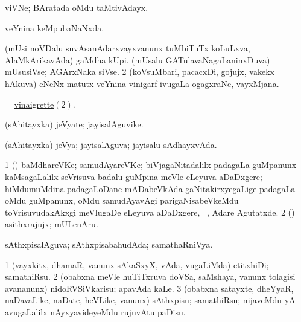 \bentry
{} 
\gl{\nA}
\bmng
 viVNe; BAratada oMdu taMtivAdayx.  
\emng
\eentry

\bentry
{} 
\gl{\gu}
\expl{}
\bmng
 veYnina keMpubaNaNxda. 
\emng
\eentry

\bentry
{} 
\gl{\nA}
\expl{}
\bmng
\bnum
{} 
\banum
{} (mUsi noVDalu suvAsanAdarxvayxvanunx tuMbiTuTx koLuLxva, AlaMkArikavAda) gaMdha kUpi. 
 (mUsalu GATulavaNagaLaninxDuva) mUsusiVse; AGArxNaka siVse. 
\hypertarget{vinaigrette(2)}{} 
\eanum
\numie
\num{2} (koVsuMbari, pacacxDi, gojujx, \mo vakekx hAkuva) eNeNx matutx veYnina vinigarf ivugaLa ogagxraNe, vayxMjana. 
\enum
\emng
\eentry

\bentry
{}
\gl{\nA}
\expl{}
\bmng
 = \hyperlink{vinaigrette(2)}{vinaigrette\((2)\)}. 
\emng
\eentry

\bentry
{} 
\gl{\nA}
\expl{}
\bmng
 (sAhitayxka) jeVyate; jayisalAguvike. 
\emng
\eentry

\bentry
{} 
\gl{\gu}
\expl{}
\bmng
 (sAhitayxka) jeVya; jayisalAguva; jayisalu sAdhayxvAda. 
\emng
\eentry

\bentry
{} 
\gl{\nA}
\bmng
\bnum
\num{1} (\biVga) baMdhareVKe; samudAyareVKe; biVjagaNitadalilx padagaLa guMpanunx kaMsagaLalilx seVrisuva badalu guMpina meVle eLeyuva aDaDxgere; hiMdumuMdina padagaLoDane mADabeVkAda gaNitakirxyegaLige padagaLa oMdu guMpanunx, oMdu samudAyavAgi parigaNisabeVkeMdu toVrisuvudakAkxgi meVlugaDe eLeyuva aDaDxgere, \udA\ , Adare  Agutatxde. 
\num{2} (\aMrashA) asithxrajujx; mULenAru. 
\enum
\emng
\eentry

\bentry
{} 
\gl{\gu}
\expl{}
\bmng
 sAthxpisalAguva; sAthxpisabahudAda; samathaRniVya. 
\emng
\eentry

\bentry
{} 
\gl{\sakirx}
\expl{}
\bmng
\bnum
\num{1} (vayxkitx, dhamaR, \mo vanunx sAkaSxyX, vAda, \mo vugaLiMda) etitxhiDi; samathiRsu. 
\num{2} (obabxna meVle huTiTxruva doVSa, saMshaya, \mo vanunx tolagisi avananunx) nidoRVSiVkarisu; apavAda kaLe. 
\num{3} (obabxna satayxte, dheYyaR, naDavaLike, naDate, heVLike, \mo vanunx) sAthxpisu; samathiRsu; nijaveMdu yA avugaLalilx nAyxyavideyeMdu rujuvAtu paDisu. 
\enum
\emng
\eentry

